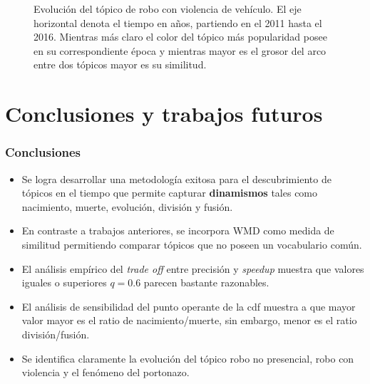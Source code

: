 \documentclass[
	spanish, %
	aspectratio=43, %
	hyperref={pdfencoding=auto,psdextra},
	xcolor={dvipsnames,table,usenames},
]{beamer}
\begin{document}
\begin{frame}
\begin{figure}
\caption{Evolución del tópico de robo con violencia de vehículo. El eje horizontal denota el tiempo en años, partiendo en el 2011 hasta el 2016. Mientras más claro el color del tópico más popularidad posee en su correspondiente época y mientras mayor es el grosor del arco entre dos tópicos mayor es su similitud.}
\label{img:violence_topic}
\end{figure}

\end{frame}


\section{Conclusiones y trabajos futuros}

\begin{frame}
\frametitle{Conclusiones}
\begin{itemize}
  \item Se logra desarrollar una metodología exitosa para el descubrimiento de tópicos en el tiempo que permite capturar \textbf{dinamismos} tales como nacimiento, muerte, evolución, división y fusión.
  \item En contraste a trabajos anteriores, se incorpora WMD como medida de similitud permitiendo comparar tópicos que no poseen un vocabulario común.
  \item El análisis empírico del \textit{trade off} entre precisión y \textit{speedup} muestra que valores iguales o superiores $q=0.6 $ parecen bastante razonables.
  \item El análisis de sensibilidad del punto operante de la cdf muestra a que mayor valor mayor es el ratio de nacimiento/muerte, sin embargo, menor es el ratio división/fusión. 
  \item Se identifica claramente la evolución del tópico robo no presencial, robo con violencia y el fenómeno del portonazo.
\end{itemize}

\end{frame}
\end{document}
